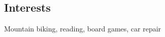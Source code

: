 \documentclass[margin,line]{resume}
\begin{document}
\begin{resume}





    \section{\mysidestyle Interests} 
    Mountain biking, reading, board games, car repair

\end{resume}
\end{document}
